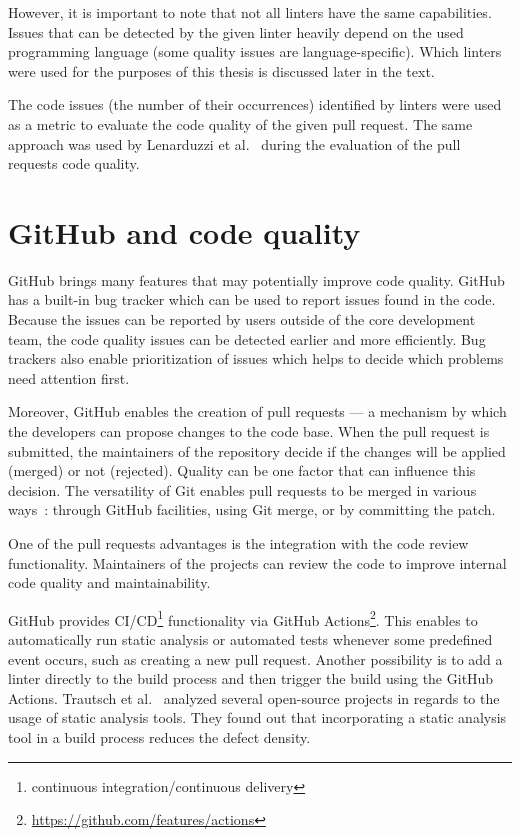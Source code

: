 \documentclass[digital,oneside,oldtable,nolof,nolot,nocover]{fithesis4}
\begin{document}
However, it is important to note that not all linters have the same
capabilities. Issues that can be detected by the given linter heavily
depend on the used programming language (some quality issues are
language-specific). Which linters were used for the purposes of this thesis
is discussed later in the text.

The code issues (the number of their occurrences) identified by linters were
used as a metric to evaluate the code quality of the given pull request.  The
same approach was used by Lenarduzzi et al.~\cite{quality} during the evaluation
of the pull requests code quality.
\section{GitHub and code quality}
\label{sec:org3f44e88}
GitHub brings many features that may potentially improve code quality.
GitHub has a built-in bug tracker which can be used to report issues found in the code.
Because the issues can be reported by users outside of the core development team,
the code quality issues can be detected earlier and more efficiently. Bug trackers
also enable prioritization of issues which helps to decide which problems need attention first.

Moreover, GitHub enables the creation of pull requests --- a mechanism by which the developers can propose changes to
the code base. When the pull request is submitted, the maintainers of the repository decide if the changes
will be applied (merged) or not (rejected). Quality can be one factor that can influence this decision.
The versatility of Git enables pull requests to be merged in various ways~\cite{exploratory}: through GitHub facilities,
using Git merge, or by committing the patch.

One of the pull requests advantages is the integration with the code review functionality. Maintainers of the projects
can review the code to improve internal code quality and maintainability.

GitHub provides CI/CD\footnote{continuous integration/continuous delivery}
functionality via GitHub Actions\footnote{\url{https://github.com/features/actions}}.
This enables to automatically run static analysis or automated tests whenever
some predefined event occurs, such as creating a new pull request.  Another
possibility is to add a linter directly to the build process and then trigger
the build using the GitHub Actions.  Trautsch et al.~\cite{pmd} analyzed several
open-source projects in regards to the usage of static analysis tools.  They
found out that incorporating a static analysis tool in a build process
reduces the defect density.
\end{document}
